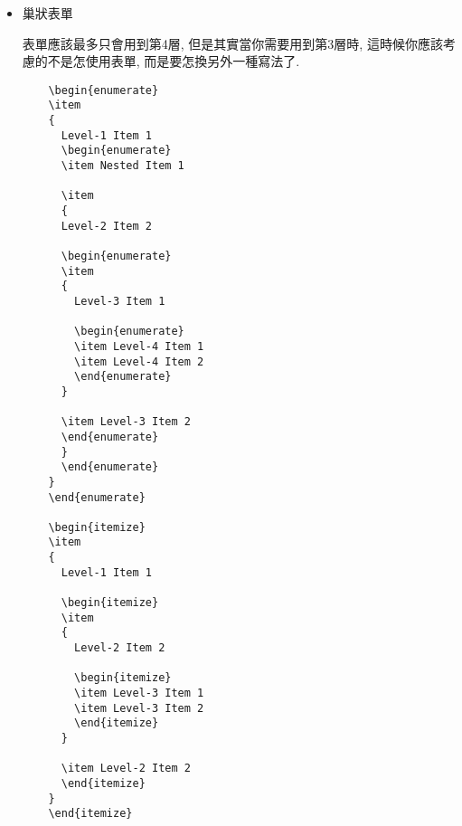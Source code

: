 \begin{itemize}
  \newpage
  \item
  {
  巢狀表單

  表單應該最多只會用到第4層, 但是其實當你需要用到第3層時, 這時候你應該考慮的不是怎使用表單, 而是要怎換另外一種寫法了.

  \begin{framed}
  \begin{verbatim}
    \begin{enumerate}
    \item
    {
      Level-1 Item 1
      \begin{enumerate}
      \item Nested Item 1

      \item
      {
      Level-2 Item 2

      \begin{enumerate}
      \item
      {
        Level-3 Item 1

        \begin{enumerate}
        \item Level-4 Item 1
        \item Level-4 Item 2
        \end{enumerate}
      }

      \item Level-3 Item 2
      \end{enumerate}
      }
      \end{enumerate}
    }
    \end{enumerate}

    \begin{itemize}
    \item
    {
      Level-1 Item 1

      \begin{itemize}
      \item
      {
        Level-2 Item 2

        \begin{itemize}
        \item Level-3 Item 1
        \item Level-3 Item 2
        \end{itemize}
      }

      \item Level-2 Item 2
      \end{itemize}
    }
    \end{itemize}
  \end{verbatim}
  \end{framed}

}
\end{itemize}
